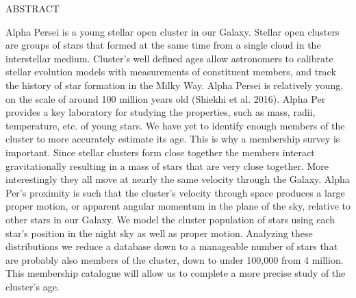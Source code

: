 \documentclass[12pt]{article}
\begin{document}
\BgThispage
\pagestyle{empty}
\centerline{\Huge{ABSTRACT}}
\huge{Alpha Persei is a young stellar open cluster in our Galaxy.  Stellar open clusters are groups of stars that formed at the same time from a single cloud in the interstellar medium.  Cluster’s well defined ages allow astronomers to calibrate stellar evolution models with measurements of constituent members, and track the history of star formation in the Milky Way.  Alpha Persei is relatively young, on the scale of around 100 million years old (Shiekhi et al. 2016).  Alpha Per provides a key laboratory for studying the properties, such as mass, radii, temperature, etc. of young stars.  We have yet to identify enough members of the cluster to more accurately estimate its age.  This is why a membership survey is important.  Since stellar clusters form close together the members interact gravitationally resulting in a mass of stars that are very close together.  More interestingly they all move at nearly the same velocity through the Galaxy. Alpha Per’s proximity is such that the cluster’s velocity through space produces a large proper motion, or apparent angular momentum in the plane of the sky, relative to other stars in our Galaxy.  We model the cluster population of stars using each star’s position in the night sky as well as proper motion. Analyzing these distributions we reduce a database down to a manageable number of stars that are  probably also members of the cluster, down to under 100,000 from 4 million.  This membership catalogue will allow us to complete a more precise study of the cluster’s age.} 
\end{document}
